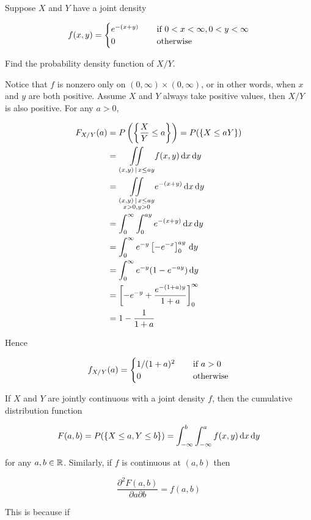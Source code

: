 \documentclass[a4paper,12pt]{article}
\begin{document}
\begin{exm}
  Suppose $X$ and $Y$ have a joint density

  $$f(x,y)=\begin{cases}
    e^{-(x+y)}&\;\;\;\;\text{if }0<x<\infty,0<y<\infty\\
    0&\;\;\;\;\text{otherwise}
  \end{cases}$$\s

  Find the probability density function of $X/Y$.\n

  \ans Notice that $f$ is nonzero only on $(0,\infty)\times(0,\infty)$, or in other words, when $x$ and $y$ are both positive. Assume $X$ and $Y$ always take positive values, then $X/Y$ is also positive. For any $a>0$,

  $$\begin{aligned}[t]
    F_{X/Y}(a)&=P\left( \left\{ \frac{X}{Y}\leq a\right\}\right)=P(\left\{ X\leq aY\right\})\\
    &=\underset{(x,y)\,\mid\, x\leq ay}{\iint}f(x,y)\,\mathrm{d} x\,\mathrm{d} y\\
    &=\underset{\substack{(x,y)\,\mid\, x\leq ay\\x>0,y>0}}{\iint}e^{-(x+y)}\,\mathrm{d} x\,\mathrm{d} y\\
    &=\int_{0}^{\infty}\int_{0}^{ay}e^{-(x+y)}\,\mathrm{d} x\,\mathrm{d} y\\
    &=\int_{0}^{\infty}e^{-y}\left[ -e^{-x}\right]_{0}^{ay}\,\mathrm{d} y\\
    &=\int_{0}^{\infty}e^{-y}(1-e^{-ay})\,\mathrm{d} y\\
    &=\left[ -e^{-y}+\frac{e^{-(1+a)y}}{1+a}\right]_{0}^{\infty}\\
    &=1-\frac{1}{1+a}
  \end{aligned}$$\s

  Hence

  $$f_{X/Y}(a)=\begin{cases}
    1/(1+a)^{2}&\;\;\;\;\text{if }a>0\\
    0&\;\;\;\;\text{otherwise}
  \end{cases}$$
\end{exm}\n

If $X$ and $Y$ are jointly continuous with a joint density $f$, then the cumulative distribution function

$$F(a,b)=P(\left\{ X\leq a,Y\leq b\right\})=\int_{-\infty}^{b}\int_{-\infty}^{a}f(x,y)\,\mathrm{d} x\,\mathrm{d} y$$\s

for any $a,b\in\mathbb{R}$. Similarly, if $f$ is continuous at $(a,b)$ then

$$\frac{\partial^{2} F(a,b)}{\partial a\partial b}=f(a,b)$$\s

This is because if
\end{document}
